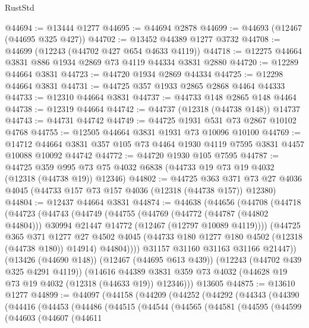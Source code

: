 \begin{lexlean}{RustStd}
\begin{coremodule}
@44694 := @13444 @1277
@44695 := @44694 @2878
@44699 := @44693 (@12467 (@44695 @325 @427))
@44702 := @13452 @44389 @1277 @3732
@44708 := @44699 (@12243 (@44702 @427 @654 @4633 @4119))
@44718 := @12275 @44664 @3831 @886 @1934 @2869 @73 @4119 @44334 @3831 @2880
@44720 := @12289 @44664 @3831
@44723 := @44720 @1934 @2869 @44334
@44725 := @12298 @44664 @3831
@44731 := @44725 @357 @1933 @2865 @2868 @4464 @44333
@44733 := @12310 @44664 @3831
@44737 := @44733 @148 @2865 @148 @4464
@44738 := @12319 @44664
@44742 := @44737 (@12318 (@44738 @148)) @14737
@44743 := @44731 @44742
@44749 := @44725 @1931 @531 @73 @2867 @10102 @4768
@44755 := @12505 @44664 @3831 @1931 @73 @10096 @10100
@44769 := @14712 @44664 @3831 @357 @105 @73 @4464 @1930 @4119 @7595 @3831 @4457 @10088 @10092 @44742
@44772 := @44720 @1930 @105 @7595
@44787 := @44725
    @359
    @995
    @73
    @75
    @4032
    @6838
    (@44733 @19 @73 @19 @4032 (@12318 (@44738 @19)) @12346)
@44802 := @44725
    @363
    @371
    @73
    @27
    @4036
    @4045
    (@44733 @157 @73 @157 @4036 (@12318 (@44738 @157)) @12380)
@44804 := @12437 @44664 @3831
@44874 := @44638
    (@44656
      (@44708
        (@44718
          (@44723
            (@44743
              (@44749
                (@44755
                  (@44769
                    (@44772 (@44787 (@44802 @44804)))
                    @30994
                    @21447
                    @14772
                    (@12467 (@12797 @10089 @4119))))
                (@44725
                  @365
                  @371
                  @1277
                  @27
                  @4502
                  @4045
                  (@44733 @180 @1277 @180 @4502 (@12318 (@44738 @180)) @14914)
                  @44804))))
          @31157
          @31160
          @31163
          @31166
          @21447))
      (@13426 (@44690 @148))
      (@12467 (@44695 @613 @439))
      (@12243 (@44702 @439 @325 @4291 @4119))
      (@14616 @44389 @3831 @359 @73 @4032 (@44628 @19 @73 @19 @4032 (@12318 (@44633 @19)) @12346)))
    @13605
@44875 := @13610 @1277
@44899 := @44097
    (@44158
      (@44209
        (@44252
          (@44292
            (@44343
              (@44390
                (@44416
                  (@44453
                    (@44486
                      (@44515
                        (@44544
                          (@44565
                            (@44581
                              (@44595
                                (@44599
                                  (@44603
                                    (@44607
                                      (@44611

\end{coremodule}
\end{lexlean}

